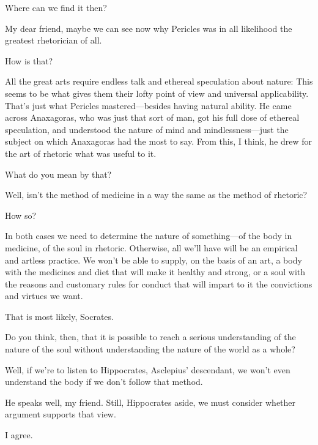 \sayphaedrus Where can we find it then?

\saysocrates My dear friend, maybe we can see now why Pericles was
in all likelihood the greatest rhetorician of all.

\sayphaedrus How is that?

\saysocrates All the great arts require endless talk and
ethereal speculation about nature: This seems to be what gives them
their lofty point of view and universal applicability. That’s just what
Pericles mastered---besides having natural ability. He came across
Anaxagoras, who was just that sort of man, got his full dose of ethereal
speculation, and understood the nature of mind and
mindlessness---just
the subject on which Anaxagoras had the most to say. From this, I think,
he drew for the art of rhetoric what was useful to it.

\sayphaedrus What do you mean by that?

\saysocrates Well, isn’t the method of medicine in a way the same
as the method of rhetoric?

\sayphaedrus How so?

\saysocrates In both cases we need to determine the nature of
something---of the body in medicine, of the soul in rhetoric. Otherwise,
all we’ll have will be an empirical and artless practice. We won’t be
able to supply, on the basis of an art, a body with the medicines and
diet that will make it healthy and strong, or a soul with the reasons
and customary rules for conduct that will impart to it the convictions
and virtues we want.

\sayphaedrus That is most likely, Socrates.

\saysocrates Do you think, then, that it is possible to reach a serious
understanding of the nature of the soul without understanding
the nature of the world as a whole?

\sayphaedrus Well, if we’re to listen to Hippocrates, Asclepius’
descendant, we won’t
even understand the body if we don’t follow that method.

\saysocrates He speaks well, my friend. Still, Hippocrates aside, we must
consider whether argument supports that view.

\sayphaedrus I agree.

